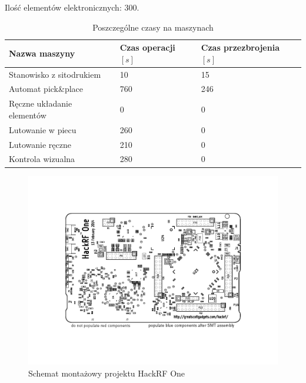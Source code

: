 \breakparagraph{}
Ilość elementów elektronicznych: 300.

\begin{table}[H]
	\centering
	\caption{Poszczególne czasy na maszynach}
	\begin{tabular}{lll}
		\toprule
		Nazwa maszyny                 & Czas operacji $[s]$ & Czas przezbrojenia $[s]$ \\
		\midrule
		Stanowisko z sitodrukiem      & 10                  & 15                       \\
		Automat pick\&place           & 760                 & 246                      \\
		Ręczne układanie elementów & 0                   & 0                        \\
		Lutowanie w piecu             & 260                 & 0                        \\
		Lutowanie ręczne             & 210                 & 0                        \\
		Kontrola wizualna             & 280                 & 0                        \\
		\bottomrule
	\end{tabular}
\end{table}

\begin{figure}[H]
	\centering
	\includegraphics[scale=0.9,clip, trim=1.5cm 2.5cm 1.5cm 2.5cm]{chapters/chapter5/hackrf-one-assembly.pdf}
	\caption{Schemat montażowy projektu HackRF One}
	\label{hackrf}
\end{figure}

\newpage
